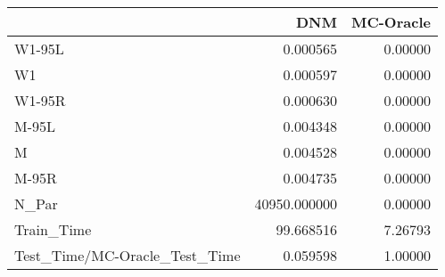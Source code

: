\begin{tabular}{lrr}
\toprule
{} &           DNM &  MC-Oracle \\
\midrule
W1-95L                        &      0.000565 &    0.00000 \\
W1                            &      0.000597 &    0.00000 \\
W1-95R                        &      0.000630 &    0.00000 \\
M-95L                         &      0.004348 &    0.00000 \\
M                             &      0.004528 &    0.00000 \\
M-95R                         &      0.004735 &    0.00000 \\
N\_Par                         &  40950.000000 &    0.00000 \\
Train\_Time                    &     99.668516 &    7.26793 \\
Test\_Time/MC-Oracle\_Test\_Time &      0.059598 &    1.00000 \\
\bottomrule
\end{tabular}
